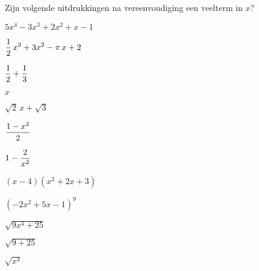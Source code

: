 \documentclass{ximera}
\begin{document}
\begin{exercise}
Zijn volgende uitdrukkingen na vereenvoudiging een veelterm in \(x\)? 
\renewcommand{\TJa }{\makebox[2.5cm]{Veelterm}}
\renewcommand{\TNee}{\makebox[2.5cm]{Geen veelterm}}
\begin{multicols}{2}

	\begin{question} \choiceYes \( 5x^4-3x^3+2x^2+x-1                    \)   \end{question}
	\begin{question} \choiceYes \( \displaystyle \frac{1}{2}\,x^3 + 3x^2-\pi\,x+2   \)   \end{question}
	\begin{question} \choiceYes \( \displaystyle \frac{1}{2}+\frac{1}{3}            \)   \end{question}
	\begin{question} \choiceYes \( x                                     \)   \end{question}
	\begin{question} \choiceYes \( \sqrt{2}\,x + \sqrt{3}                \)   \end{question}
	\begin{question} \choiceYes \( \displaystyle \frac{1-x^2}{2}                    \)   \end{question}
	\begin{question} \choiceNo  \( \displaystyle 1-\frac{2}{x^2}                    \)   \end{question}
	\begin{question} \choiceYes \( (x-4)(x^2+2x+3)                       \)   \end{question}
	\begin{question} \choiceYes \( (-2x^2+5x-1)^{9}                      \)   \end{question}
	\begin{question} \choiceNo  \( \sqrt{9x^4+25}                        \)   \end{question}
	\begin{question} \choiceYes \( \sqrt{9+25}                           \)   \end{question}
	\begin{question} \choiceYes \( \sqrt{x^4}                            \)   \end{question}

\end{multicols}
\end{exercise}
\end{document}
